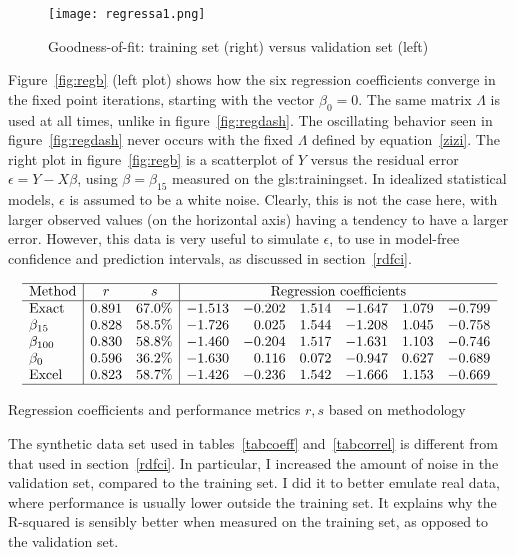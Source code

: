 \documentclass[oneside,10pt]{book}
\begin{document}
\begin{figure}%
\centering
\texttt{[image: regressa1.png]} %
\caption{Goodness-of-fit: training set (right) versus validation set (left)}
\label{fig:rega}
\end{figure}

Figure~\ref{fig:regb} (left plot) shows how the six regression coefficients converge in the fixed point iterations, starting with the vector $\beta_0=0$. The same matrix $\Lambda$ is used at all times, unlike in figure~\ref{fig:regdash}. The oscillating behavior seen in figure~\ref{fig:regdash} never occurs with the fixed $\Lambda$ 
defined by equation~\ref{zizi}. The right plot in figure~\ref{fig:regb} is a scatterplot of $Y$ versus the residual error $\epsilon=Y-X\beta$, using $\beta=\beta_{15}$ measured on the \gls{gls:trainingset}. In idealized statistical models, $\epsilon$ is assumed to be a white noise. Clearly, this is not the case here, with larger observed values (on the horizontal axis) having a tendency to have a larger error. However, this data is very useful to simulate $\epsilon$, to use in 
model-free confidence and prediction intervals, as
discussed in section~\ref{rdfci}.



\begin{table}%
\small
\[
\begin{array}{l|cc|rrrrrr}
\hline
\text{Method}  &  r & s &  \multicolumn{6}{c}{\text{Regression coefficients}}\\
\hline
\text{Exact}	&	0.891	&	67.0\%	&	-1.513	&	-0.202	&	1.514	&	-1.647	&	1.079	 &	-0.799	\\
\beta_{15}	&	0.828	&	58.5\%	&	-1.726	&	0.025	&	1.544	&	-1.208	&	1.045	&	-0.758	\\
\beta_{100}	&	0.830	&	58.8\%	&	-1.460	&	-0.204	&	1.517	&	-1.631	&	1.103	&	-0.746	\\
\beta_0	&	0.596	&	36.2\%	&	-1.630	&	0.116	&	0.072	&	-0.947	&	0.627	&	-0.689	\\
\text{Excel}	&	0.823	&	58.7\%	&	-1.426	&	-0.236	&	1.542	&	-1.666	&	1.153	&	-0.669	\\
\hline
\end{array}
\]
\caption{\label{tabcoeff}Regression coefficients and performance metrics $r, s$ based on methodology}
\end{table}

The synthetic data set used in tables~\ref{tabcoeff} and~\ref{tabcorrel} is different from that used in section~\ref{rdfci}.  In particular, I increased the amount of noise in the validation set, compared to the training set. I did it to better emulate real data, where performance is usually lower outside the training set. It explains why the R-squared is sensibly better when measured on the training set, as opposed to the validation set. 
\end{document}
